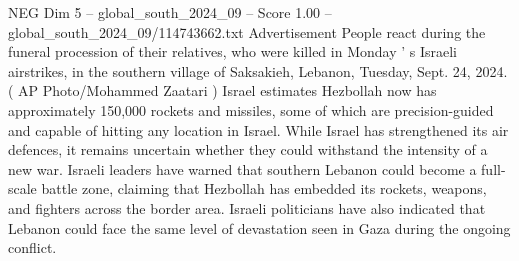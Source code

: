 \begin{textsample}{NEG Dim 5 – global\_south\_2024\_09 – Score 1.00 – global\_south\_2024\_09/114743662.txt}
Advertisement People react during the funeral procession of their relatives, who were killed in Monday ' s Israeli airstrikes, in the southern village of Saksakieh, Lebanon, Tuesday, Sept. 24, 2024. ( AP Photo/Mohammed Zaatari ) Israel estimates Hezbollah now has approximately 150,000 rockets and missiles, some of which are precision-guided and capable of hitting any location in Israel.
While Israel has strengthened its air defences, it remains uncertain whether they could withstand the intensity of a new war.
Israeli leaders have warned that southern Lebanon could become a full-scale battle zone, claiming that Hezbollah has embedded its rockets, weapons, and fighters across the border area.
Israeli politicians have also indicated that Lebanon could face the same level of devastation seen in Gaza during the ongoing conflict.

\end{textsample}
